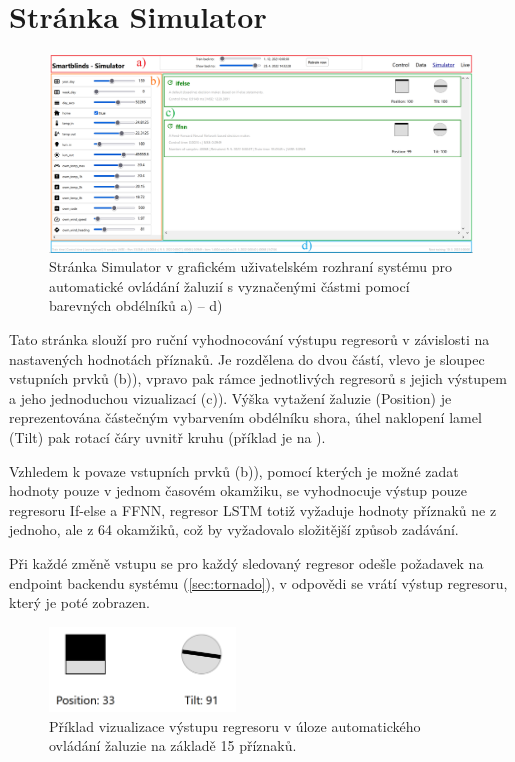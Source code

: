 \section{Stránka Simulator} \label{sec:sim}
    \begin{figure}[h]
        \centering
        \includegraphics[draft=false,width=\textwidth]{img/gui/simulator.png}
        \caption[Stránka Simulator v GUI]{Stránka Simulator v grafickém uživatelském rozhraní systému pro automatické ovládání žaluzií s vyznačenými částmi pomocí barevných obdélníků \textcolor{guired}{a)} -- \textcolor{guiblue}{d)}}
        \label{fig:simulator}
    \end{figure}
    Tato stránka slouží pro ruční vyhodnocování výstupu regresorů v závislosti na nastavených hodnotách příznaků. Je rozdělena do dvou částí, vlevo je sloupec vstupních prvků (\textcolor{guiorange}{b)}), vpravo pak rámce jednotlivých regresorů s jejich výstupem a jeho jednoduchou vizualizací (\textcolor{guigreen}{c)}). Výška vytažení žaluzie (Position) je reprezentována částečným vybarvením obdélníku shora, úhel naklopení lamel (Tilt) pak rotací čáry uvnitř kruhu (příklad je na ).
    
    Vzhledem k povaze vstupních prvků (\textcolor{guiorange}{b)}), pomocí kterých je možné zadat hodnoty pouze v jednom časovém okamžiku, se vyhodnocuje výstup pouze regresoru If-else a FFNN, regresor LSTM totiž vyžaduje hodnoty příznaků ne z jednoho, ale z 64 okamžiků, což by vyžadovalo složitější způsob zadávání.
    
    Při každé změně vstupu se pro každý sledovaný regresor odešle požadavek na endpoint  backendu systému (\cref{sec:tornado}), v odpovědi se vrátí výstup regresoru, který je poté zobrazen.
    \begin{figure}
        \centering
        \includegraphics[draft=\draftfig,width=0.44\textwidth]{img/gui/vizualizace.png}
        \caption[Vizualizace výstupu regresoru]{Příklad vizualizace výstupu regresoru v úloze automatického ovládání žaluzie na základě 15 příznaků.}
        \label{fig:vizualizace}
    \end{figure}
